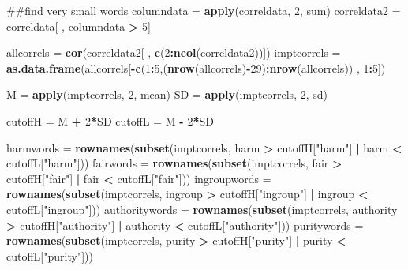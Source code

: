 \documentclass[english,man]{apa6}
\newenvironment{Shaded}{\begin{snugshade}}{\end{snugshade}}
\newcommand{\KeywordTok}[1]{\textcolor[rgb]{0.13,0.29,0.53}{\textbf{#1}}}
\newcommand{\DecValTok}[1]{\textcolor[rgb]{0.00,0.00,0.81}{#1}}
\newcommand{\StringTok}[1]{\textcolor[rgb]{0.31,0.60,0.02}{#1}}
\newcommand{\OperatorTok}[1]{\textcolor[rgb]{0.81,0.36,0.00}{\textbf{#1}}}
\newcommand{\NormalTok}[1]{#1}
\theoremstyle{definition}
\theoremstyle{definition}
\theoremstyle{definition}
\theoremstyle{remark}
\begin{document}
\begin{Shaded}
\begin{Highlighting}[]
\NormalTok{##find very small words}
\NormalTok{columndata =}\StringTok{ }\KeywordTok{apply}\NormalTok{(correldata, }\DecValTok{2}\NormalTok{, sum) }
\NormalTok{correldata2 =}\StringTok{ }\NormalTok{correldata[ , columndata }\OperatorTok{>}\StringTok{ }\DecValTok{5}\NormalTok{]}

\NormalTok{allcorrels =}\StringTok{ }\KeywordTok{cor}\NormalTok{(correldata2[ , }\KeywordTok{c}\NormalTok{(}\DecValTok{2}\OperatorTok{:}\KeywordTok{ncol}\NormalTok{(correldata2))])}
\NormalTok{imptcorrels =}\StringTok{ }\KeywordTok{as.data.frame}\NormalTok{(allcorrels[}\OperatorTok{-}\KeywordTok{c}\NormalTok{(}\DecValTok{1}\OperatorTok{:}\DecValTok{5}\NormalTok{,(}\KeywordTok{nrow}\NormalTok{(allcorrels)}\OperatorTok{-}\DecValTok{29}\NormalTok{)}\OperatorTok{:}\KeywordTok{nrow}\NormalTok{(allcorrels)) , }\DecValTok{1}\OperatorTok{:}\DecValTok{5}\NormalTok{])}

\NormalTok{M =}\StringTok{ }\KeywordTok{apply}\NormalTok{(imptcorrels, }\DecValTok{2}\NormalTok{, mean)}
\NormalTok{SD =}\StringTok{ }\KeywordTok{apply}\NormalTok{(imptcorrels, }\DecValTok{2}\NormalTok{, sd)}

\NormalTok{cutoffH =}\StringTok{ }\NormalTok{M }\OperatorTok{+}\StringTok{ }\DecValTok{2}\OperatorTok{*}\NormalTok{SD}
\NormalTok{cutoffL =}\StringTok{ }\NormalTok{M }\OperatorTok{-}\StringTok{ }\DecValTok{2}\OperatorTok{*}\NormalTok{SD}

\NormalTok{harmwords =}\StringTok{ }\KeywordTok{rownames}\NormalTok{(}\KeywordTok{subset}\NormalTok{(imptcorrels, harm }\OperatorTok{>}\StringTok{ }\NormalTok{cutoffH[}\StringTok{"harm"}\NormalTok{] }\OperatorTok{|}\StringTok{ }\NormalTok{harm }\OperatorTok{<}\StringTok{ }\NormalTok{cutoffL[}\StringTok{"harm"}\NormalTok{]))}
\NormalTok{fairwords =}\StringTok{ }\KeywordTok{rownames}\NormalTok{(}\KeywordTok{subset}\NormalTok{(imptcorrels, fair }\OperatorTok{>}\StringTok{ }\NormalTok{cutoffH[}\StringTok{"fair"}\NormalTok{] }\OperatorTok{|}\StringTok{ }\NormalTok{fair }\OperatorTok{<}\StringTok{ }\NormalTok{cutoffL[}\StringTok{"fair"}\NormalTok{]))}
\NormalTok{ingroupwords =}\StringTok{ }\KeywordTok{rownames}\NormalTok{(}\KeywordTok{subset}\NormalTok{(imptcorrels, ingroup }\OperatorTok{>}\StringTok{ }\NormalTok{cutoffH[}\StringTok{"ingroup"}\NormalTok{] }\OperatorTok{|}\StringTok{ }\NormalTok{ingroup }\OperatorTok{<}\StringTok{ }\NormalTok{cutoffL[}\StringTok{"ingroup"}\NormalTok{]))}
\NormalTok{authoritywords =}\StringTok{ }\KeywordTok{rownames}\NormalTok{(}\KeywordTok{subset}\NormalTok{(imptcorrels, authority }\OperatorTok{>}\StringTok{ }\NormalTok{cutoffH[}\StringTok{"authority"}\NormalTok{] }\OperatorTok{|}\StringTok{ }\NormalTok{authority }\OperatorTok{<}\StringTok{ }\NormalTok{cutoffL[}\StringTok{"authority"}\NormalTok{]))}
\NormalTok{puritywords =}\StringTok{ }\KeywordTok{rownames}\NormalTok{(}\KeywordTok{subset}\NormalTok{(imptcorrels, purity }\OperatorTok{>}\StringTok{ }\NormalTok{cutoffH[}\StringTok{"purity"}\NormalTok{] }\OperatorTok{|}\StringTok{ }\NormalTok{purity }\OperatorTok{<}\StringTok{ }\NormalTok{cutoffL[}\StringTok{"purity"}\NormalTok{]))}


\end{Highlighting}
\end{Shaded}
\end{document}
